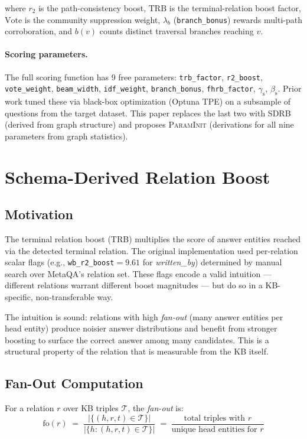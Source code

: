 \documentclass[10pt,twocolumn]{article}
\newcommand{\gS}{\gamma_{\mathrm{s}}}   %
\newcommand{\bS}{\beta_{\mathrm{s}}}    %
\newcommand{\fo}[1]{\mathrm{fo}(#1)}    %
\newcommand{\SDRB}{\textsc{SDRB}}
\newcommand{\PI}{\textsc{ParamInit}}
\newcommand{\TRB}{\textsc{TRB}}
\begin{document}
\noindent where $r_2$ is the path-consistency boost, $\mathrm{TRB}$ is the
terminal-relation boost factor, $\mathrm{Vote}$ is the community suppression
weight, $\lambda_b$ (\texttt{branch\_bonus}) rewards multi-path corroboration,
and $b(v)$ counts distinct traversal branches reaching $v$.

\paragraph{Scoring parameters.}
The full scoring function has 9 free parameters:
\texttt{trb\_factor}, \texttt{r2\_boost}, \texttt{vote\_weight},
\texttt{beam\_width}, \texttt{idf\_weight}, \texttt{branch\_bonus},
\texttt{fhrb\_factor}, $\gS$, $\bS$.
Prior work tuned these via black-box optimization (Optuna TPE) on a subsample
of questions from the target dataset. This paper replaces the last two with
\SDRB{} (derived from graph structure) and proposes \PI{} (derivations for all
nine parameters from graph statistics).

\section{Schema-Derived Relation Boost}
\label{sec:sdrb}

\subsection{Motivation}
The terminal relation boost (\TRB{}) multiplies the score of answer entities
reached via the detected terminal relation. The original implementation used
per-relation scalar flags (e.g., \texttt{wb\_r2\_boost}$=9.61$ for
\emph{written\_by}) determined by manual search over MetaQA's relation set.
These flags encode a valid intuition --- different relations warrant different
boost magnitudes --- but do so in a KB-specific, non-transferable way.

The intuition is sound: relations with high \emph{fan-out} (many answer entities
per head entity) produce noisier answer distributions and benefit from stronger
boosting to surface the correct answer among many candidates. This is a structural
property of the relation that is measurable from the KB itself.

\subsection{Fan-Out Computation}
For a relation $r$ over KB triples $\mathcal{T}$, the \emph{fan-out} is:
\begin{equation}
  \fo{r} \;=\; \frac{|\{(h,r,t) \in \mathcal{T}\}|}{|\{h : (h,r,t) \in \mathcal{T}\}|}
  \;=\; \frac{\text{total triples with } r}{\text{unique head entities for } r}
  \label{eq:fanout}
\end{equation}
\end{document}
